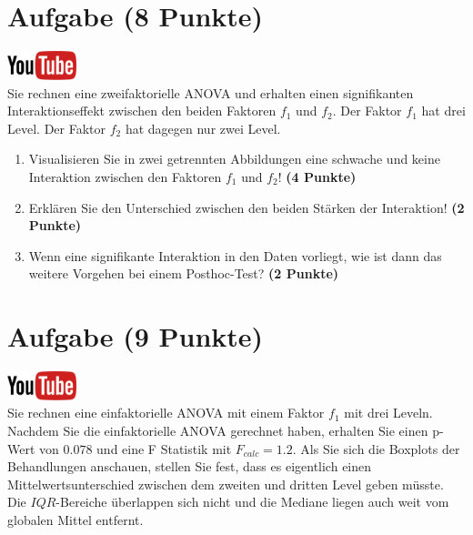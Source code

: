 \documentclass[a4paper, 9pt]{scrartcl}\usepackage[]{graphicx}\usepackage[]{xcolor}
\begin{document}
\section{Aufgabe \hfill (8 Punkte)}

\hfill\href{https://youtu.be/2qG1Dws0MJo}{\includegraphics[width =
  2cm]{img/youtube}}\\[1Ex]


Sie rechnen eine zweifaktorielle ANOVA und erhalten einen signifikanten
Interaktionseffekt zwischen den beiden Faktoren $f_1$ und $f_2$. Der Faktor
$f_1$ hat drei Level. Der Faktor $f_2$ hat dagegen nur zwei Level.




\begin{enumerate}
\item Visualisieren Sie in zwei getrennten Abbildungen 
  eine schwache und keine Interaktion zwischen
  den Faktoren $f_1$ und $f_2$! \textbf{(4 Punkte)}
\item Erkl{\"a}ren Sie den Unterschied zwischen den beiden St{\"a}rken der Interaktion!
  \textbf{(2 Punkte)}
\item Wenn eine signifikante Interaktion in den Daten vorliegt, wie ist
  dann das weitere Vorgehen bei einem Posthoc-Test? 
  \textbf{(2 Punkte)}
\end{enumerate}

 
\clearpage

\section{Aufgabe \hfill (9 Punkte)}

\hfill\href{https://youtu.be/M9Uhm67ndxM}{\includegraphics[width =
  2cm]{img/youtube}}\\[1Ex]




Sie rechnen eine einfaktorielle ANOVA mit einem Faktor $f_1$ mit
drei Leveln. Nachdem Sie die einfaktorielle ANOVA gerechnet
haben, erhalten Sie einen p-Wert von $0.078$ und eine F Statistik mit
$F_{calc} = 1.2$. Als Sie sich die Boxplots der Behandlungen anschauen,
stellen Sie fest, dass es eigentlich einen Mittelwertsunterschied zwischen
dem zweiten und dritten Level geben m{\"u}sste. Die
$IQR$-Bereiche {\"u}berlappen sich nicht und die Mediane liegen auch weit vom
globalen Mittel entfernt.
\end{document}

